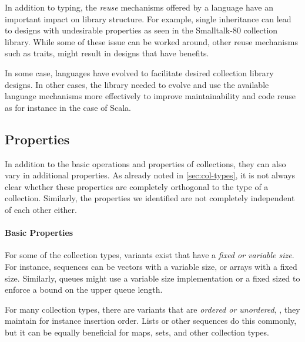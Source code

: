 \documentclass[sigconf, 10pt]{acmart}
\begin{document}
In addition to typing, the \emph{reuse} mechanisms offered by a language have
an important impact on library structure.
For example, single inheritance can lead to designs with undesirable
properties as seen in the Smalltalk-80 collection library\citep{Cook:1992:ISS}.
While some of these issue can be worked around,
other reuse mechanisms such as traits,
might result in designs that have benefits\citep{Black:2003:ATS}.

In some case, languages have evolved to facilitate
desired collection library designs\citep{Chakravarty:2005:ATC,Garcia:2007}.
In other cases,
the library needed to evolve
and use the available language mechanisms more effectively
to improve maintainability and code reuse
as for instance in the case of Scala\citep{Odersky:2009}.



\subsection{Properties}
\label{sec:col-properties}

In addition to the basic operations and properties of collections,
they can also vary in additional properties.
As already noted in \cref{sec:col-types},
it is not always clear whether these properties are completely orthogonal
to the type of a collection.
Similarly, the properties we identified are not completely independent
of each other either.

\paragraph{Basic Properties}

For some of the collection types,
variants exist that have a \emph{fixed or variable size}.
For instance, sequences can be vectors with a variable size,
or arrays with a fixed size.
Similarly, queues might use a variable size implementation or a fixed sized to
enforce a bound on the upper queue length.

For many collection types,
there are variants that are \emph{ordered or unordered},
\ie, they maintain for instance insertion order.
Lists or other sequences do this commonly,
but it can be equally beneficial for maps, sets, and other collection types.
\end{document}
